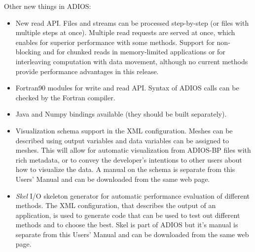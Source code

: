 Other new things in ADIOS:
\begin{itemize}
\item New read API. Files and streams can be processed step-by-step (or files with multiple steps at once). Multiple read requests are served at once, which enables for superior performance with some methods. Support for non-blocking and for chunked reads in memory-limited applications or for interleaving computation with data movement, although no current methods provide performance advantages in this release.  
\item Fortran90 modules for write and read API. Syntax of ADIOS calls can be checked by the Fortran compiler.
\item Java and Numpy bindings available (they should be built separately).
\item Visualization schema support in the XML configuration. Meshes can be described using output variables and data variables can be assigned to meshes. This will allow for automatic visualization from ADIOS-BP files with rich metadata, or to convey the developer's intentions to other users about how to visualize the data. A manual on the schema is separate from this Users' Manual and can be downloaded from the same web page. 
\item \emph{Skel} I/O skeleton generator for automatic performance evaluation of different methods. The XML configuration, that describes the output of an application, is used to generate code that can be used to test out different methods and to choose the best. Skel is part of ADIOS but it's manual is separate from this Users' Manual and can be downloaded from the same web page. 
\end{itemize}

